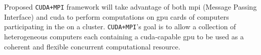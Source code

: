 Proposed \texttt{CUDA+MPI} framework will take advantage of both \gls{mpi}
(Message Passing Interface) and \gls{cuda} to perform computations on \gls{gpu}
cards of computers participating in the on a cluster.  \texttt{CUDA+MPI}'s goal
is to allow a collection of heterogeneous computers each containing a
\gls{cuda}-capable \gls{gpu} to be used as a coherent and flexible concurrent
computational resource.
